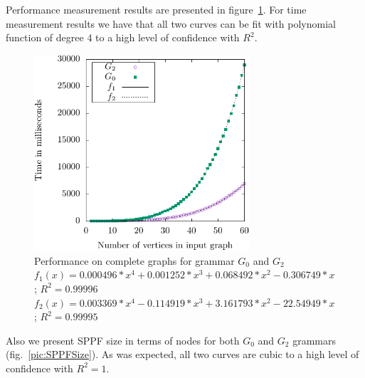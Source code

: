 Performance measurement results are presented in figure~\ref{pic:Perf}. 
For time measurement results we have that all two curves can be fit with polynomial function of degree 4 to a high level of confidence with $R^2$. 


\begin{figure}[ht]
\centering



 \includegraphics[width=8cm]{dot/grph1.pdf}
\caption{Performance on complete graphs for grammar $G_0$ and $G_2$ \\ 
$f_1(x) = 0.000496*x^4 + 0.001252*x^3 + 0.068492*x^2 - 0.306749*x$; $R^2 = 0.99996$ \\
$f_2(x) = 0.003369*x^4 - 0.114919*x^3 + 3.161793*x^2 - 22.54949*x$; $R^2 = 0.99995$}
\label{pic:Perf}
\end{figure}

Also we present SPPF size in terms of nodes for both $G_0$ and $G_2$ grammars (fig.~\ref{pic:SPPFSize}).
As was expected, all two curves are cubic to a high level of confidence with $R^2 = 1$. 

